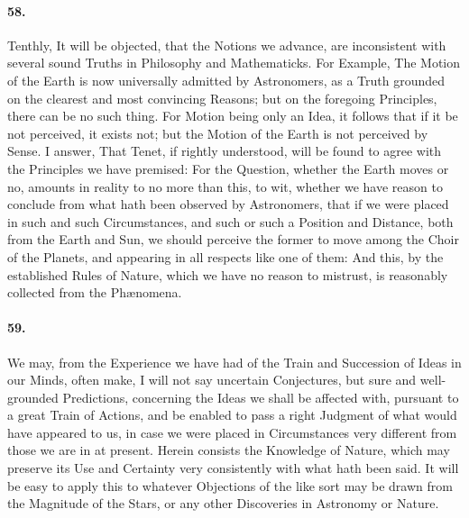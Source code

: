 \documentclass[]{article}
\newenvironment{sectionbody}{\begin{multicols}{2}}{\end{multicols}}
\begin{document}
\begin{sectionbody}
\paragraph{58.} Tenthly, It will be objected, that the Notions we advance, are
inconsistent with several sound Truths in Philosophy and
Mathematicks.  For Example, The Motion of the Earth is now
universally admitted by Astronomers, as a Truth grounded on the
clearest and most convincing Reasons;  but on the foregoing
Principles, there can be no such thing.  For Motion being only an
Idea, it follows that if it be not perceived, it exists not; but
the Motion of the Earth is not perceived by Sense.  I answer,
That Tenet, if rightly understood, will be found to agree with
the Principles we have premised: For the Question, whether the
Earth moves or no, amounts in reality to no more than this, to
wit, whether we have reason to conclude from what hath been
observed by Astronomers, that if we were placed in such and such
Circumstances, and such or such a Position and Distance, both
from the Earth and Sun, we should perceive the former to move
among the Choir of the Planets, and appearing in all respects
like one of them: And this, by the established Rules of Nature,
which we have no reason to mistrust, is reasonably collected from
the Ph{\ae}nomena.



\paragraph{59.} We may, from the Experience we have had of the Train and
Succession of Ideas in our Minds, often make, I will not say
uncertain Conjectures, but sure and well-grounded Predictions,
concerning the Ideas we shall be affected with, pursuant to a
great Train of Actions, and be enabled to pass a right Judgment
of what would have appeared to us, in case we were placed in
Circumstances very different from those we are in at present.
Herein consists the Knowledge of Nature, which may preserve its
Use and Certainty very consistently with what hath been said.  It
will be easy to apply this to whatever Objections of the like
sort may be drawn from the Magnitude of the Stars, or any other
Discoveries in Astronomy or Nature.




\end{sectionbody}
\end{document}
